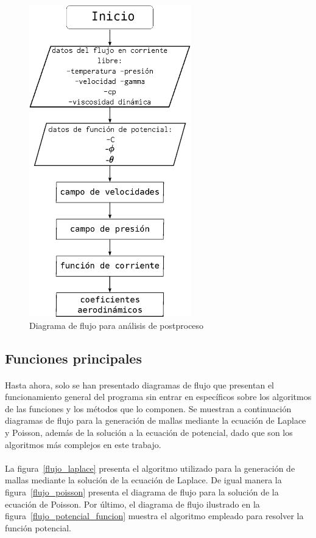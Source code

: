\documentclass[letterpaper, openright, 12pt]{book}
\begin{document}
    \begin{figure}[htbp!]
        \centering
        \includegraphics[keepaspectratio, width=70mm]
            {./img/flujo_potencial_after}
        \caption{Diagrama de flujo para análisis de postproceso}
        \label{flujo_potencial_after}
    \end{figure}

    \subsection{Funciones principales}
    \paragraph*{}
        Hasta ahora, solo se han presentado diagramas de flujo que presentan
        el funcionamiento general del programa sin entrar en específicos
        sobre los algoritmos de las funciones y los métodos que lo componen.
        Se muestran a continuación diagramas de flujo para la generación de
        mallas mediante la ecuación de Laplace y Poisson, además de la solución
        a la ecuación de potencial, dado que son los algoritmos más complejos
        en este trabajo.

    \paragraph*{}
        La figura~\ref{flujo_laplace} presenta el algoritmo utilizado para la
        generación de mallas mediante la solución de la ecuación de Laplace.
        De igual manera la figura~\ref{flujo_poisson} presenta el diagrama
        de flujo para la solución de la ecuación de Poisson. Por último, el
        diagrama de flujo ilustrado en la figura~\ref{flujo_potencial_funcion}
        muestra el algoritmo empleado para resolver la función potencial.
\end{document}
